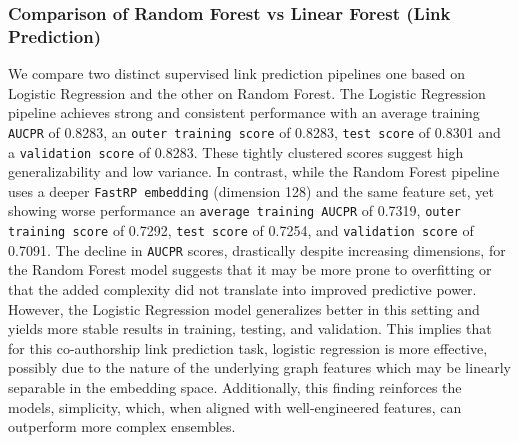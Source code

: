 \documentclass[conference]{IEEEtran}
\begin{document}
\subsubsection{\textbf{Comparison of Random Forest vs Linear Forest (Link Prediction)}} We compare two distinct supervised link prediction pipelines one based on Logistic Regression and the other on Random Forest. The Logistic Regression pipeline achieves strong and consistent performance with an average training \texttt{AUCPR} of 0.8283, an \texttt{outer training score} of 0.8283, \texttt{test score} of 0.8301 and a \texttt{validation score} of 0.8283. These tightly clustered scores suggest high generalizability and low variance. In contrast, while the Random Forest pipeline uses a deeper \texttt{FastRP embedding} (dimension 128) and the same feature set, yet showing worse performance an \texttt{average training AUCPR} of 0.7319, \texttt{outer training score} of 0.7292, \texttt{test score} of 0.7254, and \texttt{validation score} of 0.7091. The decline in \texttt{AUCPR} scores, drastically despite increasing dimensions, for the Random Forest model suggests that it may be more prone to overfitting or that the added complexity did not translate into improved predictive power. However, the Logistic Regression model generalizes better in this setting and yields more stable results in training, testing, and validation. This implies that for this co-authorship link prediction task, logistic regression is more effective, possibly due to the nature of the underlying graph features which may be linearly separable in the embedding space. Additionally, this finding reinforces the models, simplicity, which, when aligned with well-engineered features, can outperform more complex ensembles.
\\
\end{document}
